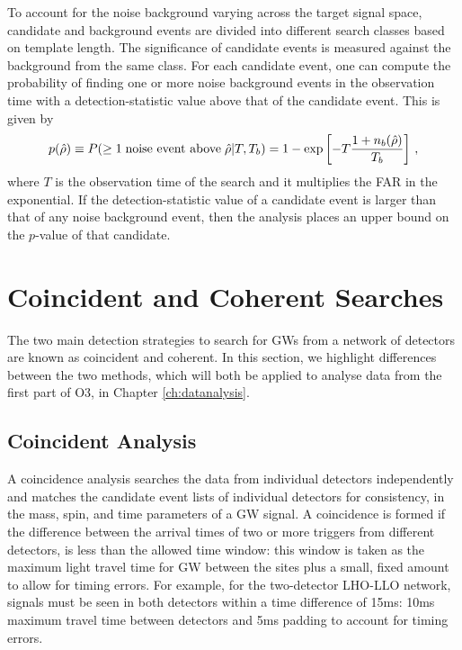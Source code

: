 \documentclass[binding=0.6cm, LaM]{sapthesis}
\begin{document}
	To account for the noise background varying across the target signal space, 
	candidate and background events are divided into different search classes based on template length. 
	The significance of candidate events is measured against the background from the same class. 
	For each candidate event, one can compute the probability of finding one or more 
	noise background events in the observation time with a detection-statistic value above that of the candidate event.  This is given by 
        \begin{equation}
          p(\hat \rho) \equiv P(\geq 1 \hspace*{0.1cm}\text{noise event above}\hspace*{0.1cm} \hat \rho|T,T_b) = 1 - \exp\left[-T{{1+n_b(\hat \rho)} \over{T_b}}\right]\,,
        \end{equation}
	where $T$ is the observation time of the search and it multiplies the FAR in the exponential.
	If the detection-statistic value of a candidate event is larger 
	than that of any noise background event, 
	then the analysis places an upper bound on the $p$-value of that candidate. 
	

\section{Coincident and Coherent Searches}
	The two main detection strategies to search for GWs 	
	from a network of detectors are known as coincident and coherent.  
	In this section, we highlight differences between the two methods, 
	which will both be applied to analyse data from the first part of O3, in Chapter \ref{ch:datanalysis}.  


\subsection{Coincident Analysis}
\label{subsec:coincident}
 	A coincidence analysis searches the data from individual detectors independently        
        and matches the candidate event lists of individual detectors for consistency,
        in the mass, spin, and time parameters of a GW signal.
	A coincidence is formed if the difference between the arrival times of two or more triggers from different detectors, 
	is less than the allowed time window:
	this window is taken as the maximum light travel time for GW between the sites plus a small, 
	fixed amount to allow for timing errors. 
	For example, for the two-detector LHO-LLO network, signals must be seen in both detectors within a time difference of 15ms: 
	10ms maximum travel time between detectors and 5ms padding to account for timing errors.
\end{document}
